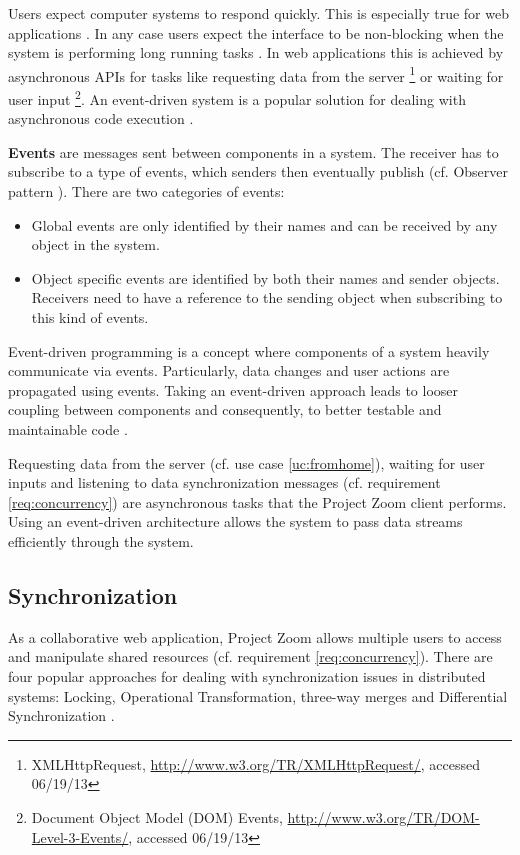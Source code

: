 Users expect computer systems to respond quickly. This is especially true for web applications \cite{Selvidge_1999}. In any case users expect the interface to be non-blocking when the system is performing long running tasks \cite{Nielsen_1994}.  In web applications this is achieved by asynchronous APIs for tasks like requesting data from the server \footnote{XMLHttpRequest, \url{http://www.w3.org/TR/XMLHttpRequest/}, accessed 06/19/13} or waiting for user input \footnote{Document Object Model (DOM) Events, \url{http://www.w3.org/TR/DOM-Level-3-Events/}, accessed 06/19/13}. An event-driven system is a popular solution for dealing with asynchronous code execution \cite{Michelson_2006}. 

\textbf{Events} are messages sent between components in a system. The receiver has to subscribe to a type of events, which senders then eventually publish (cf. Observer pattern \cite{Gamma_1994}). There are two categories of events:
\begin{itemize}
\item Global events are only identified by their names and can be received by any object in the system.
\item Object specific events are identified by both their names and sender objects. Receivers need to have a reference to the sending object when subscribing to this kind of events.
\end{itemize}

Event-driven programming is a concept where components of a system heavily communicate via events. Particularly, data changes and user actions are propagated using events. Taking an event-driven approach leads to looser coupling between components and consequently, to better testable and maintainable code \cite{Faison_2011}.

Requesting data from the server (cf. use case \ref{uc:fromhome}), waiting for user inputs and listening to data synchronization messages (cf. requirement \ref{req:concurrency}) are asynchronous tasks that the Project Zoom client performs. Using an event-driven architecture allows the system to pass data streams efficiently through the system.


\subsection{Synchronization}
As a collaborative web application, Project Zoom allows multiple users to access and manipulate shared resources (cf. requirement \ref{req:concurrency}). There are four popular approaches for dealing with synchronization issues in distributed systems: Locking, Operational Transformation, three-way merges and Differential Synchronization \cite{Fraser_2009}.

